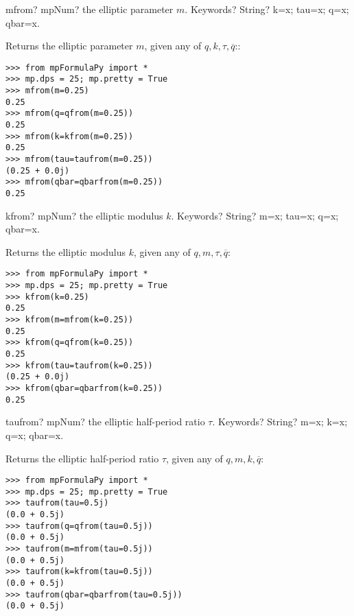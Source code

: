 \vspace{0.6cm}

\begin{mpFunctionsExtract}
	\mpFunctionOne
	{mfrom? mpNum? the elliptic parameter $m$.}
	{Keywords? String? k=x; tau=x; q=x; qbar=x.}
\end{mpFunctionsExtract}

\vpara
Returns the elliptic parameter $m$, given any of $q, k, \tau, \overline{q}$::

\begin{lstlisting}
>>> from mpFormulaPy import *
>>> mp.dps = 25; mp.pretty = True
>>> mfrom(m=0.25)
0.25
>>> mfrom(q=qfrom(m=0.25))
0.25
>>> mfrom(k=kfrom(m=0.25))
0.25
>>> mfrom(tau=taufrom(m=0.25))
(0.25 + 0.0j)
>>> mfrom(qbar=qbarfrom(m=0.25))
0.25
\end{lstlisting}



\vspace{0.6cm}

\begin{mpFunctionsExtract}
	\mpFunctionOne
	{kfrom? mpNum? the elliptic modulus $k$.}
	{Keywords? String? m=x; tau=x; q=x; qbar=x.}
\end{mpFunctionsExtract}

\vpara
Returns the elliptic modulus $k$, given any of $q, m, \tau, \overline{q}$:

\begin{lstlisting}
>>> from mpFormulaPy import *
>>> mp.dps = 25; mp.pretty = True
>>> kfrom(k=0.25)
0.25
>>> kfrom(m=mfrom(k=0.25))
0.25
>>> kfrom(q=qfrom(k=0.25))
0.25
>>> kfrom(tau=taufrom(k=0.25))
(0.25 + 0.0j)
>>> kfrom(qbar=qbarfrom(k=0.25))
0.25
\end{lstlisting}



\vspace{0.6cm}

\begin{mpFunctionsExtract}
	\mpFunctionOne
	{taufrom? mpNum? the elliptic half-period ratio $\tau$.}
	{Keywords? String? m=x; k=x; q=x; qbar=x.}
\end{mpFunctionsExtract}

\vpara
Returns the elliptic half-period ratio $\tau$, given any of $q, m, k, \overline{q}$:

\begin{lstlisting}
>>> from mpFormulaPy import *
>>> mp.dps = 25; mp.pretty = True
>>> taufrom(tau=0.5j)
(0.0 + 0.5j)
>>> taufrom(q=qfrom(tau=0.5j))
(0.0 + 0.5j)
>>> taufrom(m=mfrom(tau=0.5j))
(0.0 + 0.5j)
>>> taufrom(k=kfrom(tau=0.5j))
(0.0 + 0.5j)
>>> taufrom(qbar=qbarfrom(tau=0.5j))
(0.0 + 0.5j)
\end{lstlisting}


